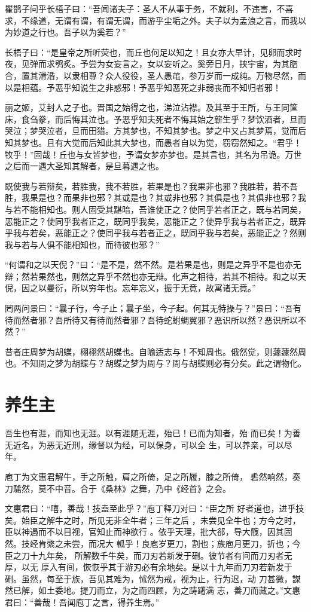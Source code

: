 \documentclass[a4paper,12pt,UTF8,twoside]{ctexbook}
\begin{document}
瞿鹊子问乎长梧子曰：“吾闻诸夫子：圣人不从事于务，不就利，不违害，不喜求，不缘道，无谓有谓，有谓无谓，而游乎尘垢之外。夫子以为孟浪之言，而我以为妙道之行也。吾子以为奚若？”

长梧子曰：“是皇帝之所听荧也，而丘也何足以知之！且女亦大早计，见卵而求时夜，见弹而求鸮炙。予尝为女妄言之，女以妄听之。奚旁日月，挟宇宙，为其脗合，置其滑涽，以隶相尊？众人役役，圣人愚芚，参万岁而一成纯。万物尽然，而以是相蕴。予恶乎知说生之非惑邪！予恶乎知恶死之非弱丧而不知归者邪！

丽之姬，艾封人之子也。晋国之始得之也，涕泣沾襟。及其至于王所，与王同筐床，食刍豢，而后悔其泣也。予恶乎知夫死者不悔其始之蕲生乎？梦饮酒者，旦而哭泣；梦哭泣者，旦而田猎。方其梦也，不知其梦也。梦之中又占其梦焉，觉而后知其梦也。且有大觉而后知此其大梦也，而愚者自以为觉，窃窃然知之。“君乎！牧乎！”固哉！丘也与女皆梦也，予谓女梦亦梦也。是其言也，其名为吊诡。万世之后而一遇大圣知其解者，是旦暮遇之也。

既使我与若辩矣，若胜我，我不若胜，若果是也？我果非也邪？我胜若，若不吾胜，我果是也？而果非也邪？其或是也？其或非也邪？其俱是也？其俱非也邪？我与若不能相知也。则人固受其黮暗，吾谁使正之？使同乎若者正之，既与若同矣，恶能正之？使同乎我者正之，既同乎我矣，恶能正之？使异乎我与若者正之，既异乎我与若矣，恶能正之？使同乎我与若者正之，既同乎我与若矣，恶能正之？然则我与若与人俱不能相知也，而待彼也邪？”

“何谓和之以天倪？”曰：“是不是，然不然。是若果是也，则是之异乎不是也亦无辩；然若果然也，则然之异乎不然也亦无辩。化声之相待，若其不相待。和之以天倪，因之以曼衍，所以穷年也。忘年忘义，振于无竟，故寓诸无竟。”

罔两问景曰：“曩子行，今子止；曩子坐，今子起。何其无特操与？”景曰：“吾有待而然者邪？吾所待又有待而然者邪？吾待蛇蚹蜩翼邪？恶识所以然？恶识所以不然？”

昔者庄周梦为胡蝶，栩栩然胡蝶也。自喻适志与！不知周也。俄然觉，则蘧蘧然周也。不知周之梦为胡蝶与？胡蝶之梦为周与？周与胡蝶则必有分矣。此之谓物化。

\section{养生主}

吾生也有涯，而知也无涯。以有涯随无涯，殆已！已而为知者，殆 而已矣！为善无近名，为恶无近刑，缘督以为经，可以保身，可以全 生，可以养亲，可以尽年。

庖丁为文惠君解牛，手之所触，肩之所倚，足之所履，膝之所倚， 砉然响然，奏刀騞然，莫不中音。合于《桑林》之舞，乃中《经首》之会。

文惠君曰：“嘻，善哉！技盍至此乎？”庖丁释刀对曰：“臣之所 好者道也，进乎技矣。始臣之解牛之时，所见无非全牛者；三年之后 ，未尝见全牛也；方今之时，臣以神遇而不以目视，官知止而神欲行 。依乎天理，批大郤，导大髋，因其固然。技经肯綮之未尝，而况大 軱乎！良庖岁更刀，割也；族庖月更刀，折也；今臣之刀十九年矣， 所解数千牛矣，而刀刃若新发于硎。彼节者有间而刀刃者无厚，以无 厚入有间，恢恢乎其于游刃必有余地矣。是以十九年而刀刃若新发于 硎。虽然，每至于族，吾见其难为，怵然为戒，视为止，行为迟，动 刀甚微，謋然已解，如土委地。提刀而立，为之而四顾，为之踌躇满 志，善刀而藏之。”文惠君曰：“善哉！吾闻庖丁之言，得养生焉。”
\end{document}
